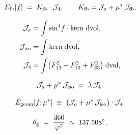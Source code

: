 

\begin{equation}
  E_{\mathrm{fb}}[f] \;=\; K_{\mathrm{fb}}\cdot\mathcal{J}_4,
  \qquad
  K_{\mathrm{fb}} = \mathcal{J}_a + \mu^*\,\mathcal{J}_{\mathrm{fb}},
  \label{P1:eq:Efb}
\end{equation}

\begin{align}
  \mathcal{J}_a   &= \int \sin^4\!f\cdot\mathrm{kern}\;\mathrm{dvol},
           \label{P1:eq:J2a} \\
  \mathcal{J}_{\mathrm{iso}} &= \int \mathrm{kern}\;\mathrm{dvol},
           \label{P1:eq:Jiso} \\
  \mathcal{J}_4 &= \int \bigl(F_{13}^2 + F_{12}^2 + F_{23}^2\bigr)\;\mathrm{dvol},
           \label{P1:eq:J4}
\end{align}

\begin{equation}
  \mathcal{J}_a + \mu^*\,\mathcal{J}_{\mathrm{iso}} \;=\; \lambda\,\mathcal{J}_4.
  \label{P1:eq:derrick}
\end{equation}

\begin{equation}
  E_{\mathrm{geom}}[f;\mu^*]
  \;\equiv\; \bigl(\mathcal{J}_a + \mu^*\,\mathcal{J}_{\mathrm{iso}}\bigr)\cdot\mathcal{J}_4.
  \label{P1:eq:Egeom}
\end{equation}

\begin{equation}
  \theta_{\mathrm{g}} \;=\; \frac{360}{\varphi^2} \;\approx\; 137.508^\circ,
  \label{P3:eq:golden_angle}
\end{equation}

